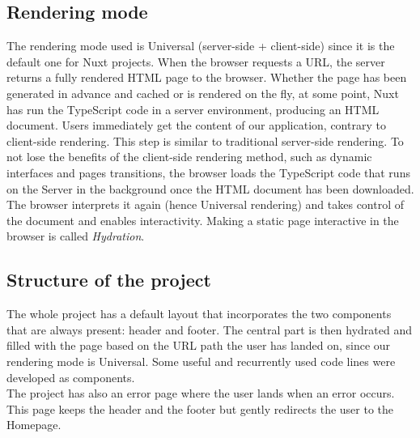 \documentclass[11pt, letterpaper]{article}
\begin{document}
\subsection{Rendering mode}
The rendering mode used is Universal (server-side + client-side) since it is the default one for Nuxt projects. 
When the browser requests a URL, the server returns a fully rendered HTML page to the browser. 
Whether the page has been generated in advance and cached or is rendered on the fly, at some point, Nuxt has run the TypeScript code in a server environment, producing an HTML document. 
Users immediately get the content of our application, contrary to client-side rendering. 
This step is similar to traditional server-side rendering.
To not lose the benefits of the client-side rendering method, such as dynamic interfaces and pages transitions, the browser loads the TypeScript code that runs on the Server in the background once the HTML document has been downloaded. 
The browser interprets it again (hence Universal rendering) and takes control of the document and enables interactivity.
Making a static page interactive in the browser is called \emph{Hydration}.

\subsection{Structure of the project}
The whole project has a default layout that incorporates the two components that are always present: header and footer.
The central part is then hydrated and filled with the page based on the URL path the user has landed on, since our rendering mode is Universal.
Some useful and recurrently used code lines were developed as components. \\
The project has also an error page where the user lands when an error occurs. This page keeps the header and the footer but gently redirects the user to the Homepage.
\end{document}
